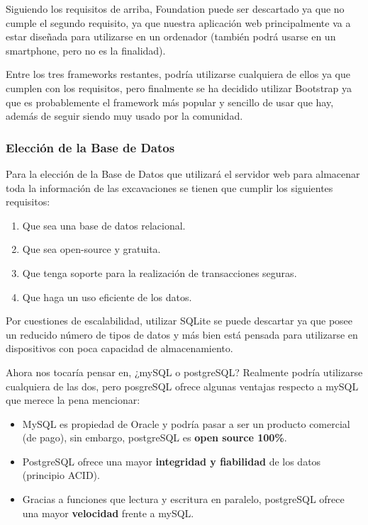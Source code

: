     Siguiendo los requisitos de arriba, Foundation puede ser descartado ya que no cumple el
    segundo requisito, ya que nuestra aplicación web principalmente va a estar diseñada para
    utilizarse en un ordenador (también podrá usarse en un smartphone, pero no es la
    finalidad).

    Entre los tres frameworks restantes, podría utilizarse cualquiera de ellos ya que cumplen
    con los requisitos, pero finalmente se ha decidido utilizar Bootstrap ya que es
    probablemente el framework más popular y sencillo de usar que hay, además de seguir
    siendo muy usado por la comunidad. 
    

    \subsubsection{Elección de la Base de Datos}
    Para la elección de la Base de Datos que utilizará el servidor web para almacenar toda
    la información de las excavaciones se tienen que cumplir los siguientes requisitos:

        \begin{enumerate}
            \item Que sea una base de datos relacional.
            \item Que sea open-source y gratuita.
            \item Que tenga soporte para la realización de transacciones seguras.
            \item Que haga un uso eficiente de los datos.
        \end{enumerate}

    Por cuestiones de escalabilidad, utilizar SQLite se puede descartar ya que posee un
    reducido número de tipos de datos y más bien está pensada para utilizarse en dispositivos
    con poca capacidad de almacenamiento.

    Ahora nos tocaría pensar en, ¿mySQL o postgreSQL? Realmente podría utilizarse cualquiera
    de las dos, pero posgreSQL ofrece algunas ventajas respecto a mySQL que merece la pena
    mencionar: 
    
        \begin{itemize}
            \item MySQL es propiedad de Oracle y podría pasar a ser un producto comercial
            (de pago), sin embargo, postgreSQL es \textbf{open source 100\%}.
            \item PostgreSQL ofrece una mayor \textbf{integridad y fiabilidad} de los datos
            (principio ACID).
            \item Gracias a funciones que lectura y escritura en paralelo, postgreSQL ofrece
            una mayor \textbf{velocidad} frente a mySQL.
        \end{itemize}
    
